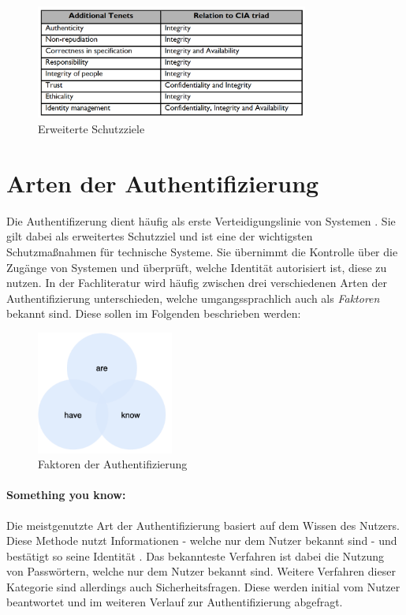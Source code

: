 \begin{figure}[h]
	\centering 
	\includegraphics[width=0.8\textwidth]{img/abbildungen/Schutzziele.png}
	\captionsetup{format=hang}
	\caption{Erweiterte Schutzziele \cite{samonas2014cia}} \label{Schutzziele}
\end{figure}



\section{Arten der Authentifizierung}

Die Authentifizerung dient häufig als erste Verteidigungslinie von Systemen \cite{boonkrong2012security}. Sie gilt dabei als erweitertes Schutzziel und ist eine der wichtigsten Schutzmaßnahmen für technische Systeme. Sie übernimmt die Kontrolle über die Zugänge von Systemen und überprüft, welche Identität autorisiert ist, diese zu nutzen. In der Fachliteratur wird häufig zwischen drei verschiedenen Arten der Authentifizierung unterschieden, welche umgangssprachlich auch als \textit{Faktoren} bekannt sind. Diese sollen im Folgenden beschrieben werden:

\begin{figure}[h]
	\centering 
	\includegraphics[width=0.4\textwidth]{img/abbildungen/factors.png}
	\captionsetup{format=hang}
	\caption{Faktoren der Authentifizierung}
\end{figure}

\paragraph*{Something you know:}
Die meistgenutzte Art der Authentifizierung basiert auf dem Wissen des Nutzers. Diese Methode nutzt Informationen - welche nur dem Nutzer bekannt sind - und bestätigt so seine Identität \cite{boonkrong2012security}. Das bekannteste Verfahren ist dabei die Nutzung von Passwörtern, welche nur dem Nutzer bekannt sind. Weitere Verfahren dieser Kategorie sind allerdings auch Sicherheitsfragen. Diese werden initial vom Nutzer beantwortet und im weiteren Verlauf zur Authentifizierung abgefragt.

